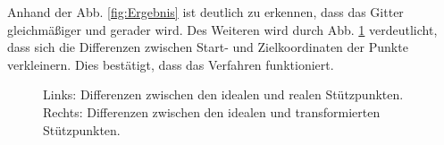 Anhand der Abb. \ref{fig:Ergebnis} ist deutlich zu erkennen, dass das Gitter gleichmäßiger und gerader wird. Des Weiteren wird durch Abb. \ref{fig:diffsResult} verdeutlicht, dass sich die Differenzen zwischen Start- und Zielkoordinaten der Punkte verkleinern. Dies bestätigt, dass das Verfahren funktioniert.

\begin{figure}[H]
	\caption{Links: Differenzen zwischen den idealen und realen Stützpunkten. \\Rechts: Differenzen zwischen den idealen und transformierten Stützpunkten.}
	\label{fig:diffsResult}
\end{figure}

